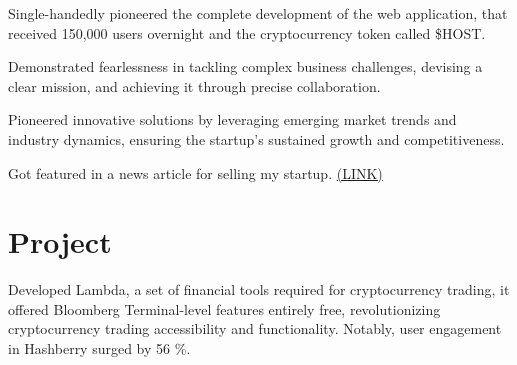 \documentclass[a4paper]{deedy-resume} %
\begin{document}
\begin{minipage}[t]{0.66\textwidth}
\sectionspace 


\vspace{\topsep} 

\begin{tightitemize}
\item Single-handedly pioneered the complete development of the web application, that received 150,000 users overnight and the cryptocurrency token called \$HOST.
\item Demonstrated fearlessness in tackling complex business challenges, devising a clear mission, and achieving it through precise collaboration.
\item Pioneered innovative solutions by leveraging emerging market trends and industry dynamics, ensuring the startup's sustained growth and competitiveness.
\item Got featured in a news article for selling my startup. %
\href{https://www.deccanherald.com/brandspot/sponsored/meet-the-crypto-boy-of-bengaluru-1221031.html}{(LINK)}
\end{tightitemize}

\sectionspace 





\section{Project}






Developed Lambda, a set of financial tools required for cryptocurrency trading, it offered Bloomberg Terminal-level features entirely free, revolutionizing cryptocurrency trading accessibility and functionality. Notably, user engagement in Hashberry surged by 56 \%. \\

\sectionspace %


\end{minipage}
\end{document}
